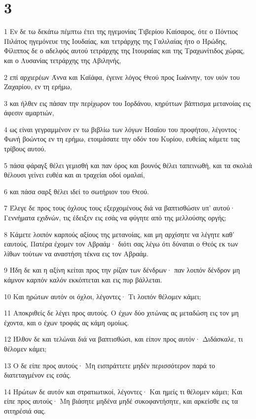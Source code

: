 \chapter{3}

\par 1 Εν δε τω δεκάτω πέμπτω έτει της ηγεμονίας Τιβερίου Καίσαρος, ότε ο Πόντιος Πιλάτος ηγεμόνευε της Ιουδαίας, και τετράρχης της Γαλιλαίας ήτο ο Ηρώδης, Φίλιππος δε ο αδελφός αυτού τετράρχης της Ιτουραίας και της Τραχωνίτιδος χώρας, και ο Λυσανίας τετράρχης της Αβιληνής,
\par 2 επί αρχιερέων Άννα και Καϊάφα, έγεινε λόγος Θεού προς Ιωάννην, τον υιόν του Ζαχαρίου, εν τη ερήμω,
\par 3 και ήλθεν εις πάσαν την περίχωρον του Ιορδάνου, κηρύττων βάπτισμα μετανοίας εις άφεσιν αμαρτιών,
\par 4 ως είναι γεγραμμένον εν τω βιβλίω των λόγων Ησαΐου του προφήτου, λέγοντος· Φωνή βοώντος εν τη ερήμω, ετοιμάσατε την οδόν του Κυρίου, ευθείας κάμετε τας τρίβους αυτού.
\par 5 πάσα φάραγξ θέλει γεμισθή και παν όρος και βουνός θέλει ταπεινωθή, και τα σκολιά θέλουσι γείνει ευθέα και αι τραχείαι οδοί ομαλαί,
\par 6 και πάσα σαρξ θέλει ιδεί το σωτήριον του Θεού.
\par 7 Έλεγε δε προς τους όχλους τους εξερχομένους διά να βαπτισθώσιν υπ' αυτού· Γεννήματα εχιδνών, τις έδειξεν εις εσάς να φύγητε από της μελλούσης οργής;
\par 8 Κάμετε λοιπόν καρπούς αξίους της μετανοίας, και μη αρχίσητε να λέγητε καθ' εαυτούς, Πατέρα έχομεν τον Αβραάμ· διότι σας λέγω ότι δύναται ο Θεός εκ των λίθων τούτων να αναστήση τέκνα εις τον Αβραάμ.
\par 9 Ήδη δε και η αξίνη κείται προς την ρίζαν των δένδρων· παν λοιπόν δένδρον μη κάμνον καρπόν καλόν εκκόπτεται και εις πυρ βάλλεται.
\par 10 Και ηρώτων αυτόν οι όχλοι, λέγοντες· Τι λοιπόν θέλομεν κάμει;
\par 11 Αποκριθείς δε λέγει προς αυτούς. Ο έχων δύο χιτώνας ας μεταδώση εις τον μη έχοντα, και ο έχων τροφάς ας κάμη ομοίως.
\par 12 Ήλθον δε και τελώναι διά να βαπτισθώσι, και είπον προς αυτόν· Διδάσκαλε, τι θέλομεν κάμει;
\par 13 Ο δε είπε προς αυτούς· Μη εισπράττετε μηδέν περισσότερον παρά το διατεταγμένον εις εσάς.
\par 14 Ηρώτων δε αυτόν και στρατιωτικοί, λέγοντες· Και ημείς τι θέλομεν κάμει; Και είπε προς αυτούς· Μη βιάσητε μηδένα μηδέ συκοφαντήσητε, και αρκείσθε εις τα σιτηρέσιά σας.
